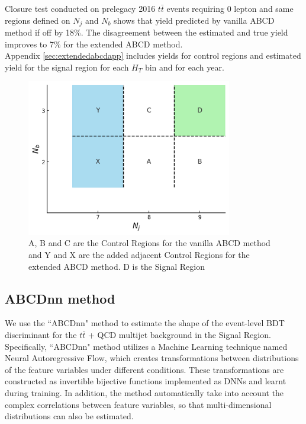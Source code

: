 \documentclass[twoside]{article}
\begin{document}
Closure test conducted on prelegacy 2016 $t\bar{t}$ events requiring 0 lepton and same regions defined on $N_j$ and $N_b$ shows that yield predicted by vanilla ABCD method if off by 18\%. The disagreement between the estimated and true yield improves to 7\% for the extended ABCD method.\\

Appendix \ref{sec:extendedabcdapp} includes yields for control regions and estimated yield for the signal region for each $H_T$ bin and for each year.

\begin{figure}[ht]
    \centering
    \includegraphics[width=0.8\textwidth]{plots/extendedabcd/extendedabcd_scheme.png} 
    \caption{A, B and C are the Control Regions for the vanilla ABCD method and Y and X are the added adjacent Control Regions for the extended ABCD method. D is the Signal Region}
    \label{fig:extendedabcd} 
\end{figure}

\subsection{ABCDnn method}
We use the ``ABCDnn" method to estimate the shape of the event-level BDT discriminant for the $t\bar{t}$ + QCD multijet background in the Signal Region. Specifically, ``ABCDnn" method utilizes a Machine Learning technique named Neural Autoregressive Flow, which creates transformations between distributions of the feature variables under different conditions. These transformations are constructed as invertible bijective functions implemented as DNNs and learnt during training. In addition, the method automatically take into account the complex correlations between feature variables, so that multi-dimensional distributions can also be estimated. \\
\end{document}
